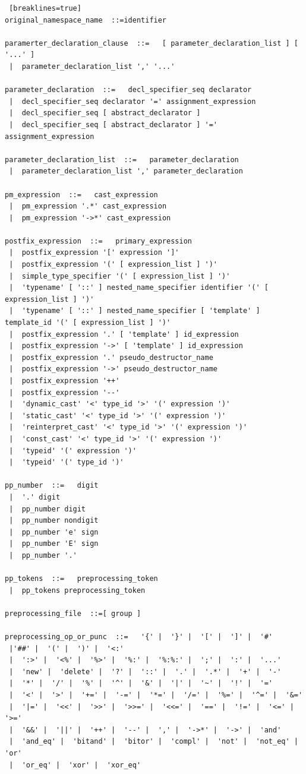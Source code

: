 \documentclass[11pt]{book}
\begin{document}
\begin{lstlisting} [breaklines=true]
original_namespace_name  ::=identifier

paramerter_declaration_clause  ::=   [ parameter_declaration_list ] [ '...' ]
 |  parameter_declaration_list ',' '...'

parameter_declaration  ::=   decl_specifier_seq declarator
 |  decl_specifier_seq declarator '=' assignment_expression
 |  decl_specifier_seq [ abstract_declarator ]
 |  decl_specifier_seq [ abstract_declarator ] '=' assignment_expression

parameter_declaration_list  ::=   parameter_declaration
 |  parameter_declaration_list ',' parameter_declaration

pm_expression  ::=   cast_expression
 |  pm_expression '.*' cast_expression
 |  pm_expression '->*' cast_expression

postfix_expression  ::=   primary_expression
 |  postfix_expression '[' expression ']'
 |  postfix_expression '(' [ expression_list ] ')'
 |  simple_type_specifier '(' [ expression_list ] ')'
 |  'typename' [ '::' ] nested_name_specifier identifier '(' [ expression_list ] ')'
 |  'typename' [ '::' ] nested_name_specifier [ 'template' ] template_id '(' [ expression_list ] ')'
 |  postfix_expression '.' [ 'template' ] id_expression
 |  postfix_expression '->' [ 'template' ] id_expression
 |  postfix_expression '.' pseudo_destructor_name
 |  postfix_expression '->' pseudo_destructor_name
 |  postfix_expression '++'
 |  postfix_expression '--'
 |  'dynamic_cast' '<' type_id '>' '(' expression ')'
 |  'static_cast' '<' type_id '>' '(' expression ')'
 |  'reinterpret_cast' '<' type_id '>' '(' expression ')'
 |  'const_cast' '<' type_id '>' '(' expression ')'
 |  'typeid' '(' expression ')'
 |  'typeid' '(' type_id ')'

pp_number  ::=   digit
 |  '.' digit
 |  pp_number digit
 |  pp_number nondigit
 |  pp_number 'e' sign
 |  pp_number 'E' sign
 |  pp_number '.'

pp_tokens  ::=   preprocessing_token
 |  pp_tokens preprocessing_token

preprocessing_file  ::=[ group ]

preprocessing_op_or_punc  ::=   '{' |  '}' |  '[' |  ']' |  '#' 
 |'##' |  '(' |  ')' |  '<:'
 |  ':>' |  '<%' |  '%>' |  '%:' |  '%:%:' |  ';' |  ':' |  '...'
 |  'new' |  'delete' |  '?' |  '::' |  '.' |  '.*' |  '+' |  '-'
 |  '*' |  '/' |  '%' |  '^' |  '&' |  '|' |  '~' |  '!' |  '='
 |  '<' |  '>' |  '+=' |  '-=' |  '*=' |  '/=' |  '%=' |  '^=' |  '&='
 |  '|=' |  '<<' |  '>>' |  '>>=' |  '<<=' |  '==' |  '!=' |  '<=' |  '>='
 |  '&&' |  '||' |  '++' |  '--' |  ',' |  '->*' |  '->' |  'and'
 |  'and_eq' |  'bitand' |  'bitor' |  'compl' |  'not' |  'not_eq' |  'or'
 |  'or_eq' |  'xor' |  'xor_eq'
 

\end{lstlisting}
\end{document}
